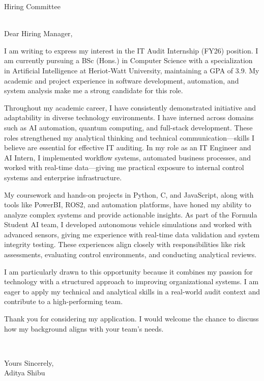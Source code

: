 \documentclass{letter}
\begin{document}
\begin{letter}{Hiring Committee \\ [Deloitte] \\ [United Arab Emirates]}

\opening{Dear Hiring Manager,}

I am writing to express my interest in the IT Audit Internship (FY26) position. I am currently pursuing a BSc (Hons.) in Computer Science with a specialization in Artificial Intelligence at Heriot-Watt University, maintaining a GPA of 3.9. My academic and project experience in software development, automation, and system analysis make me a strong candidate for this role.

Throughout my academic career, I have consistently demonstrated initiative and adaptability in diverse technology environments. I have interned across domains such as AI automation, quantum computing, and full-stack development. These roles strengthened my analytical thinking and technical communication—skills I believe are essential for effective IT auditing. In my role as an IT Engineer and AI Intern, I implemented workflow systems, automated business processes, and worked with real-time data—giving me practical exposure to internal control systems and enterprise infrastructure.

My coursework and hands-on projects in Python, C, and JavaScript, along with tools like PowerBI, ROS2, and automation platforms, have honed my ability to analyze complex systems and provide actionable insights. As part of the Formula Student AI team, I developed autonomous vehicle simulations and worked with advanced sensors, giving me experience with real-time data validation and system integrity testing. These experiences align closely with responsibilities like risk assessments, evaluating control environments, and conducting analytical reviews.

I am particularly drawn to this opportunity because it combines my passion for technology with a structured approach to improving organizational systems. I am eager to apply my technical and analytical skills in a real-world audit context and contribute to a high-performing team.

Thank you for considering my application. I would welcome the chance to discuss how my background aligns with your team’s needs.

\closing{~}

Yours Sincerely,\\[2mm]
Aditya Shibu

\end{letter}
\end{document}
